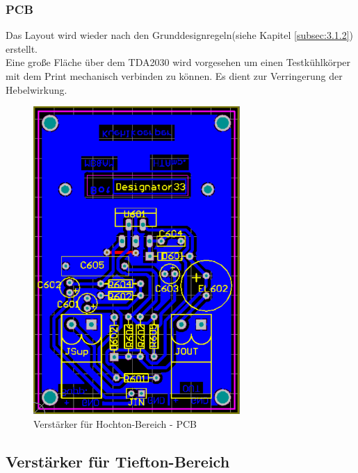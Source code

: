 \newpage
\subsubsection{PCB}\label{subsec:4.5.3}
Das Layout wird wieder nach den Grunddesignregeln(siehe Kapitel \ref{subsec:3.1.2}) erstellt.\\
Eine große Fläche über dem TDA2030 wird vorgesehen um einen Testkühlkörper mit dem Print mechanisch verbinden zu können.
Es dient zur Verringerung der Hebelwirkung.

\begin{figure} [H]
	\centering	
	\includegraphics[width=0.7\textwidth]{img/Print6/HTVerstaerker-PCB.PNG}
	\caption{Verstärker für Hochton-Bereich - PCB}
	\label {fig:4.5.3.1}
\end{figure}


\newpage
\subsection{Verstärker für Tiefton-Bereich}
